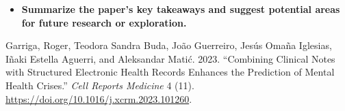 \documentclass[
  letterpaper,
  DIV=11,
  numbers=noendperiod]{scrartcl}
\providecommand{\tightlist}{%
  \setlength{\itemsep}{0pt}\setlength{\parskip}{0pt}}\usepackage{longtable,booktabs,array}
\newlength{\cslhangindent}
\newenvironment{CSLReferences}[2] %
 {\begin{list}{}{%
  \setlength{\itemindent}{0pt}
  \setlength{\leftmargin}{0pt}
  \setlength{\parsep}{0pt}
  \ifodd #1
   \setlength{\leftmargin}{\cslhangindent}
   \setlength{\itemindent}{-1\cslhangindent}
  \fi
  \setlength{\itemsep}{#2\baselineskip}}}
 {\end{list}}
\begin{document}
\begin{itemize}
\tightlist
\item
  \textbf{Summarize the paper's key takeaways and suggest potential
  areas for future research or exploration.}
\end{itemize}

\label{refs}
\begin{CSLReferences}{1}{0}
Garriga, Roger, Teodora Sandra Buda, João Guerreiro, Jesús Omaña
Iglesias, Iñaki Estella Aguerri, and Aleksandar Matić. 2023.
{``Combining Clinical Notes with Structured Electronic Health Records
Enhances the Prediction of Mental Health Crises.''} \emph{Cell Reports
Medicine} 4 (11). \url{https://doi.org/10.1016/j.xcrm.2023.101260}.

\end{CSLReferences}
\end{document}

